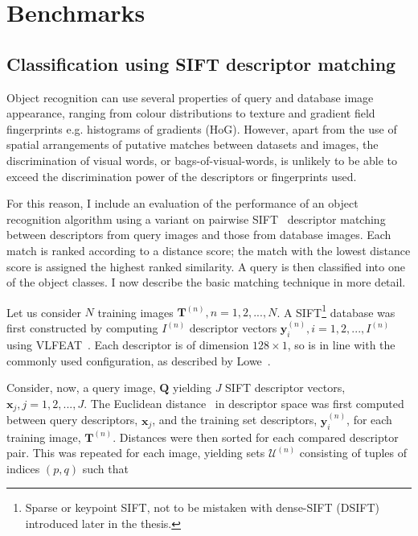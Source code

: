 \section{Benchmarks} \label{sec:benchmarks}




\subsection{Classification using SIFT descriptor matching}

Object recognition can use several properties of query and da\-ta\-ba\-se image appearance, ranging from colour distributions to texture and gradient field fingerprints e.g. histograms of gradients (HoG). However, apart from the use of spatial arrangements of putative matches between datasets and images, the discrimination of visual words, or bags-of-visual-words, is unlikely to be able to exceed the discrimination power of the descriptors or fingerprints used.

For this reason, I include an evaluation of the performance of an object recognition algorithm using a variant on pairwise SIFT~\cite{lowe2004distinctive} descriptor matching between descriptors from query images and those from database images. Each match is ranked according to a distance score; the match with the lowest distance score is assigned the highest ranked similarity. A query is then classified into one of the object classes. I now describe the basic matching technique in more detail.

Let us consider $N$ training images $\mathbf{T}^{(n)}, n = 1, 2, ..., N$. A SIFT\footnote{Sparse or keypoint SIFT, not to be mistaken with dense-SIFT (DSIFT) introduced later in the thesis.} database was first constructed by computing $I^{(n)}$ descriptor vectors $\mathbf{y}_i^{(n)}, i = 1, 2, ..., I^{(n)}$ using VLFEAT~\cite{Vedaldi2008}. Each descriptor is of dimension $128\times 1$, so is in line with the commonly used configuration, as described by Lowe~\cite{lowe2004distinctive}.

Consider, now, a query image, $\mathbf{Q}$ yielding $J$ SIFT descriptor vectors, $\mathbf{x}_j, j = 1,2,...,J$. The Euclidean distance~\cite{Vedaldi2008} in descriptor space was first computed between query descriptors, $\mathbf{x}_j$, and the training set descriptors, $\mathbf{y}_i^{(n)}$, for each training image, $\mathbf{T}^{(n)}$. Distances were then sorted for each compared descriptor pair.  This was repeated for each image, yielding sets $\mathcal{U}^{(n)}$ consisting of tuples of indices $(p,q)$ such that

